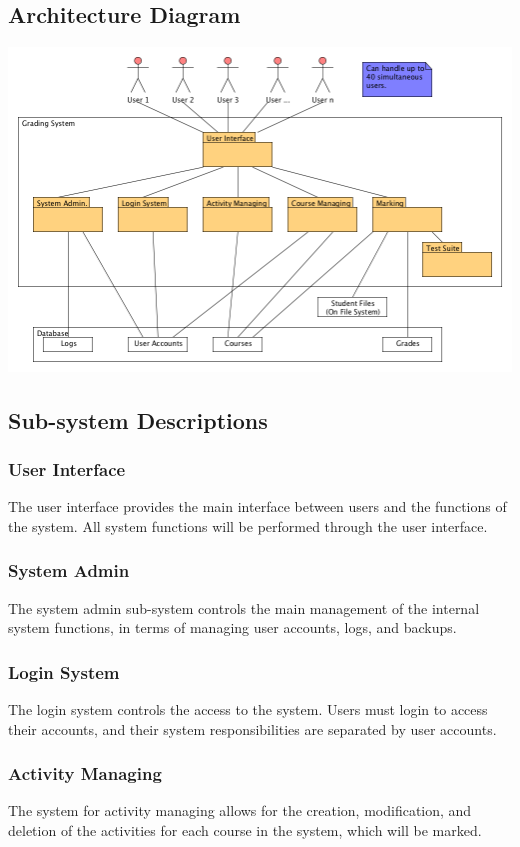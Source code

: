 \documentclass{article}
\begin{document}
\subsection{Architecture Diagram}
\centerline{\includegraphics[scale=0.55]{../images/architectureDiagram}}

\subsection{Sub-system Descriptions}
\subsubsection{User Interface}
The user interface provides the main interface between users and the functions
of the system. All system functions will be performed through the user interface.
\subsubsection{System Admin}
The system admin sub-system controls the main management of the internal
system functions, in terms of managing user accounts, logs, and backups.
\subsubsection{Login System}
The login system controls the access to the system. Users must login to access 
their accounts, and their system responsibilities are separated by user accounts.
\subsubsection{Activity Managing}
The system for activity managing allows for the creation, modification, and deletion
of the activities for each course in the system, which will be marked.
\end{document}
